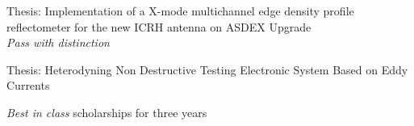 \footnotesize{\faBook\hspace{0.5em} Thesis: Implementation of a X-mode multichannel edge density profile reflectometer for the new ICRH antenna on ASDEX Upgrade}
\\
\footnotesize{\faTrophy\hspace{0.5em} \textit{Pass with distinction}}

\divider



\footnotesize{\faBook\hspace{0.5em} Thesis: Heterodyning Non Destructive Testing Electronic System Based on Eddy Currents}

\divider

\footnotesize{\faTrophy\hspace{0.5em} \textit{Best in class} scholarships for three years}

